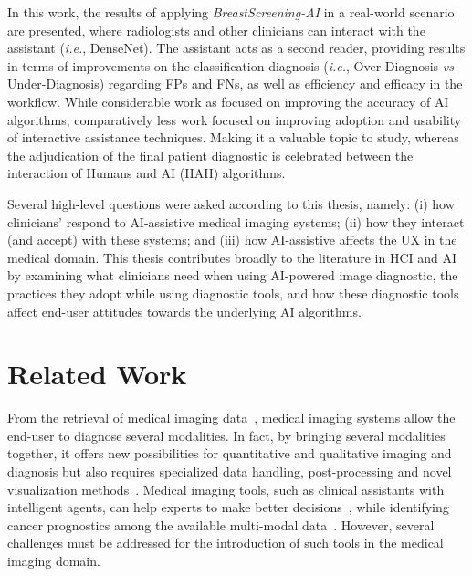 In this work, the results of applying {\it BreastScreening-AI} in a real-world scenario are presented, where radiologists and other clinicians can interact with the assistant ({\it i.e.}, DenseNet).
The assistant acts as a second reader, providing results in terms of improvements on the classification diagnosis ({\it i.e.}, Over-Diagnosis {\it vs} Under-Diagnosis) regarding \acp{FP} and \acp{FN}, as well as efficiency and efficacy in the workflow.
While considerable work as focused on improving the accuracy of \ac{AI} algorithms, comparatively less work focused on improving adoption and usability of interactive assistance techniques.
Making it a valuable topic to study, whereas the adjudication of the final patient diagnostic is celebrated between the interaction of Humans and \ac{AI} (\ac{HAII}) algorithms.

Several high-level questions were asked according to this thesis, namely:
(i) how clinicians' respond to \ac{AI}-assistive medical imaging systems;
(ii) how they interact (and accept) with these systems; and
(iii) how \ac{AI}-assistive affects the \ac{UX} in the medical domain.
This thesis contributes broadly to the literature in \ac{HCI} and \ac{AI} by examining what clinicians need when using \ac{AI}-powered image diagnostic, the practices they adopt while using diagnostic tools, and how these diagnostic tools affect end-user attitudes towards the underlying \ac{AI} algorithms.

\section{Related Work}
\label{sec:app002002}

From the retrieval of medical imaging data~\cite{faraji2019radiologic, seifabadi2019correlation}, medical imaging systems allow the end-user to diagnose several modalities.
In fact, by bringing several modalities together, it offers new possibilities for quantitative and qualitative imaging and diagnosis but also requires specialized data handling, post-processing and novel visualization methods~\cite{Igarashi:2016:IVS:2984511.2984537, Ocegueda-Hernandez:2016:CMN:2876456.2879485, Sousa:2017:VVR:3025453.3025566}.
Medical imaging tools, such as clinical assistants with intelligent agents, can help experts to make better decisions~\cite{Lopes:2017:UHC:3143820.3144118}, while identifying cancer prognostics among the available multi-modal data~\cite{lopes2018interaction}.
However, several challenges must be addressed for the introduction of such tools in the medical imaging domain.

